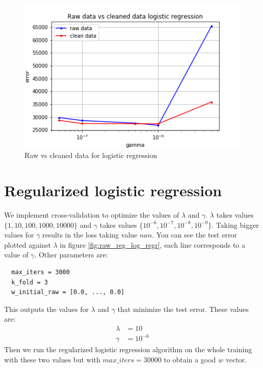\documentclass[11pt, a4paper, twocolumn]{article}
\begin{document}
\begin{figure}[h!]
  \includegraphics[width=\linewidth]{raw_vs_clean_log_reg.png}
  \caption{Raw vs cleaned data for logistic regression}
  \label{fig:raw_clean_log_reg}
\end{figure}

\newpage
\section{Regularized logistic regression}
We implement cross-validation to optimize the values of $\lambda$ and $\gamma$. $\lambda$ takes values
$\{1,10,100,1000,10000\}$ and $\gamma$ takes values $\{10^{-6},10^{-7},10^{-8},10^{-9}\}$. Taking bigger
values for $\gamma$ results in the loss taking value $nan$. You can see the test error plotted against $\lambda$ in figure \ref{fig:raw_reg_log_regr}, each line corresponds to a value of $\gamma$. Other parameters are: 
\begin{lstlisting}
  max_iters = 3000
  k_fold = 3
  w_initial_raw = [0.0, ..., 0.0]
\end{lstlisting}

This outputs the values for $\lambda$ and $\gamma$ that minimize the test error. These values are:
\begin{align*}
  \lambda &= 10 \\
  \gamma &= 10^{-6}
\end{align*}
Then we run the regularized logistic regression algorithm on the whole training with these two values but with $max\_iters = 30000$ to obtain a good $w$ vector.
\end{document}
